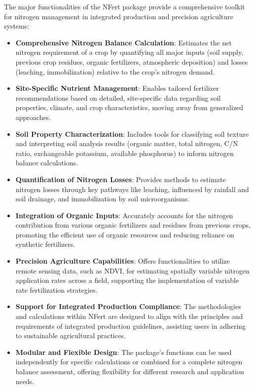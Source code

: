\documentclass[
  11pt,
]{article}
\begin{document}
The major functionalities of the NFert package provide a comprehensive
toolkit for nitrogen management in integrated production and precision
agriculture systems:

\begin{itemize}
\item
  \textbf{Comprehensive Nitrogen Balance Calculation}: Estimates the net
  nitrogen requirement of a crop by quantifying all major inputs (soil
  supply, previous crop residues, organic fertilizers, atmospheric
  deposition) and losses (leaching, immobilization) relative to the
  crop's nitrogen demand.
\item
  \textbf{Site-Specific Nutrient Management}: Enables tailored
  fertilizer recommendations based on detailed, site-specific data
  regarding soil properties, climate, and crop characteristics, moving
  away from generalized approaches.
\item
  \textbf{Soil Property Characterization}: Includes tools for
  classifying soil texture and interpreting soil analysis results
  (organic matter, total nitrogen, C/N ratio, exchangeable potassium,
  available phosphorus) to inform nitrogen balance calculations.
\item
  \textbf{Quantification of Nitrogen Losses}: Provides methods to
  estimate nitrogen losses through key pathways like leaching,
  influenced by rainfall and soil drainage, and immobilization by soil
  microorganisms.
\item
  \textbf{Integration of Organic Inputs}: Accurately accounts for the
  nitrogen contribution from various organic fertilizers and residues
  from previous crops, promoting the efficient use of organic resources
  and reducing reliance on synthetic fertilizers.
\item
  \textbf{Precision Agriculture Capabilities}: Offers functionalities to
  utilize remote sensing data, such as NDVI, for estimating spatially
  variable nitrogen application rates across a field, supporting the
  implementation of variable rate fertilization strategies.
\item
  \textbf{Support for Integrated Production Compliance}: The
  methodologies and calculations within NFert are designed to align with
  the principles and requirements of integrated production guidelines,
  assisting users in adhering to sustainable agricultural practices.
\item
  \textbf{Modular and Flexible Design}: The package's functions can be
  used independently for specific calculations or combined for a
  complete nitrogen balance assessment, offering flexibility for
  different research and application needs.
\end{itemize}
\end{document}
